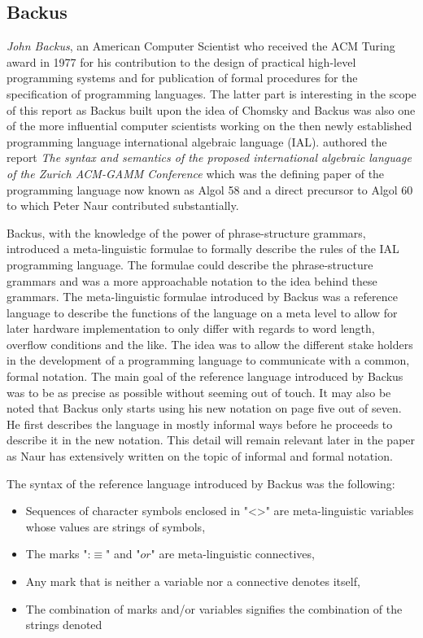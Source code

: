 \documentclass{article}
\begin{document}
\subsection{Backus}
\textit{John Backus}, an American Computer Scientist who received the ACM Turing award in 1977 for his contribution to the design of practical high-level programming systems and for publication of formal procedures for the specification of programming languages. The latter part is interesting in the scope of this report as Backus built upon the idea of Chomsky and Backus was also one of the more influential computer scientists working on the then newly established programming language international algebraic language (IAL). \citet{Backus1959TheSA} authored the report \textit{The syntax and semantics of the proposed international algebraic language of the Zurich ACM-GAMM Conference} which was the defining paper of the programming language now known as Algol 58 and a direct precursor to Algol 60 to which Peter Naur contributed substantially.

Backus, with the knowledge of the power of phrase-structure grammars, introduced a meta-linguistic formulae to formally describe the rules of the IAL programming language. The formulae could describe the phrase-structure grammars and was a more approachable notation to the idea behind these grammars. The meta-linguistic formulae introduced by Backus was a reference language to describe the functions of the language on a meta level to allow for later hardware implementation to only differ with regards to word length, overflow conditions and the like. The idea was to allow the different stake holders in the development of a programming language to communicate with a common, formal notation. The main goal of the reference language introduced by Backus was to be as precise as possible without seeming out of touch. It may also be noted that Backus only starts using his new notation on page five out of seven. He first describes the language in mostly informal ways before he proceeds to describe it in the new notation. This detail will remain relevant later in the paper as Naur has extensively written on the topic of informal and formal notation.

The syntax of the reference language introduced by Backus was the following:
\begin{itemize}
	\item Sequences of character symbols enclosed in "<>" are meta-linguistic variables whose values are strings of symbols,
	\item The marks ":$\equiv$" and "$or$" are meta-linguistic connectives,
	\item Any mark that is neither a variable nor a connective denotes itself,
	\item The combination of marks and/or variables signifies the combination of the strings denoted
\end{itemize} 
\end{document}
